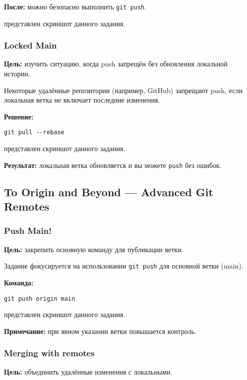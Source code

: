 \documentclass[a4paper,12pt]{report}
\begin{document}
\textbf{После:} можно безопасно выполнить \texttt{git push}.

 представлен скриншот данного задания.

\subsubsection{Locked Main}
\textbf{Цель:} изучить ситуацию, когда push запрещён без обновления локальной истории.

Некоторые удалённые репозитории (например, GitHub) запрещают push, если локальная ветка не включает последние изменения.

\textbf{Решение:}
\begin{verbatim}
git pull --rebase
\end{verbatim}

 представлен скриншот данного задания.

\textbf{Результат:} локальная ветка обновляется и вы можете \texttt{push} без ошибок.

\subsection{To Origin and Beyond — Advanced Git Remotes}

\subsubsection{Push Main!}
\textbf{Цель:} закрепить основную команду для публикации ветки.

Задание фокусируется на использовании \texttt{git push} для основной ветки (main).

\textbf{Команда:}
\begin{verbatim}
git push origin main
\end{verbatim}

 представлен скриншот данного задания.

\textbf{Примечание:} при явном указании ветки повышается контроль.

\subsubsection{Merging with remotes}
\textbf{Цель:} объединить удалённые изменения с локальными.
\end{document}
